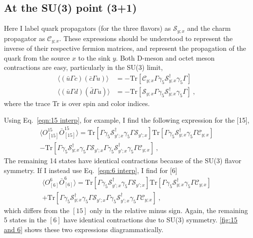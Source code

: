 \documentclass[11pt]{article}
\begin{document}
\subsection{At the SU(3) point (3+1)}
Here I label quark propagators (for the three flavors) as $\mathcal{S}^{}_{y;x}$ and the charm propagator as $\mathcal{C}^{}_{y;x}$.  These expressions should be understood to represent the inverse of their respective fermion matrices, and represent the propagation of the quark from the source $x$ to the sink $y$.  Both D-meson and octet meson contractions are easy, particularly in the SU(3) limit,
\begin{align}
\langle \left(\bar{u}\Gamma c\right)\left(\bar{c}\Gamma u\right)\rangle&=-\text{Tr}\left[\mathcal{C}^{}_{y;x}\Gamma\gamma_5 \mathcal{S}^\dag_{y;x} \gamma_5\Gamma\right]\\
\langle \left(\bar{u}\Gamma d\right)\left(\bar{d}\Gamma u\right)\rangle&=-\text{Tr}\left[\mathcal{S}^{}_{y;x}\Gamma\gamma_5 \mathcal{S}^\dag_{y;x} \gamma_5\Gamma\right]\ ,
\end{align}
where the trace Tr is over spin and color indices. 

Using Eq.~\eqref{eqn:15 interp}, for example, I find the following expression for the [15],
\begin{multline}\label{eqn:15 contraction}
\langle O^{15}_{[15]}\bar{O}^{15}_{[15]}\rangle = 
\text{Tr}\left[\Gamma \gamma_5\mathcal{S}^\dag_{y';x}\gamma_5\Gamma\mathcal{S}^{}_{y';x}\right]
\text{Tr}\left[\Gamma \gamma_5\mathcal{S}^\dag_{y;x}\gamma_5\Gamma\mathcal{C}^{}_{y;x}\right]\\
-\text{Tr}\left[\Gamma \gamma_5\mathcal{S}^\dag_{y;x}\gamma_5\Gamma\mathcal{S}^{}_{y';x}\Gamma \gamma_5\mathcal{S}^\dag_{y';x}\gamma_5\Gamma\mathcal{C}^{}_{y;x}\right]\ ,
\end{multline}
The remaining 14 states have identical contractions because of the SU(3) flavor symmetry.  If I instead use Eq.~\eqref{eqn:6 interp}, I find for [6]
\begin{multline}\label{eqn:6 contraction}
\langle O^{6}_{[6]}\bar{O}^{6}_{[6]}\rangle = 
\text{Tr}\left[\Gamma \gamma_5\mathcal{S}^\dag_{y';x}\gamma_5\Gamma\mathcal{S}^{}_{y';x}\right]
\text{Tr}\left[\Gamma \gamma_5\mathcal{S}^\dag_{y;x}\gamma_5\Gamma\mathcal{C}^{}_{y;x}\right]\\
+\text{Tr}\left[\Gamma \gamma_5\mathcal{S}^\dag_{y;x}\gamma_5\Gamma\mathcal{S}^{}_{y';x}\Gamma \gamma_5\mathcal{S}^\dag_{y';x}\gamma_5\Gamma\mathcal{C}^{}_{y;x}\right]\ ,
\end{multline}
which differs from the $[15]$  only in the relative minus sign.  Again, the remaining 5 states in the $[6]$ have identical contractions due to SU(3) symmetry.  \autoref{fig:15 and 6} shows these two expressions diagrammatically.
\end{document}
